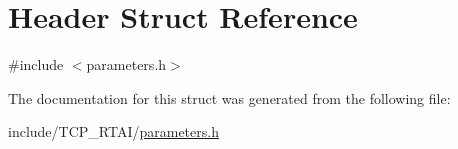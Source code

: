 \hypertarget{structHeader}{
\section{Header Struct Reference}
\label{structHeader}
}


{\ttfamily \#include $<$parameters.h$>$}



The documentation for this struct was generated from the following file:\begin{DoxyCompactItemize}
\item 
include/TCP\_\-RTAI/\hyperlink{include_2TCP__RTAI_2parameters_8h}{parameters.h}\end{DoxyCompactItemize}
